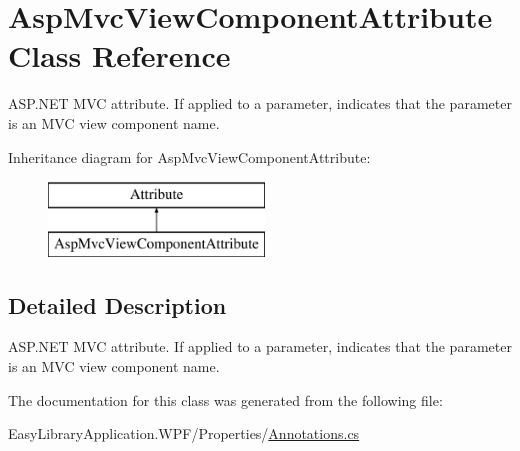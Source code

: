 \hypertarget{class_asp_mvc_view_component_attribute}{}\section{Asp\+Mvc\+View\+Component\+Attribute Class Reference}
\label{class_asp_mvc_view_component_attribute}


A\+S\+P.\+N\+ET M\+VC attribute. If applied to a parameter, indicates that the parameter is an M\+VC view component name.  


Inheritance diagram for Asp\+Mvc\+View\+Component\+Attribute\+:\begin{figure}[H]
\begin{center}
\leavevmode
\includegraphics[height=2.000000cm]{class_asp_mvc_view_component_attribute}
\end{center}
\end{figure}


\subsection{Detailed Description}
A\+S\+P.\+N\+ET M\+VC attribute. If applied to a parameter, indicates that the parameter is an M\+VC view component name. 



The documentation for this class was generated from the following file\+:\begin{DoxyCompactItemize}
\item 
Easy\+Library\+Application.\+W\+P\+F/\+Properties/\mbox{\hyperlink{_annotations_8cs}{Annotations.\+cs}}\end{DoxyCompactItemize}
